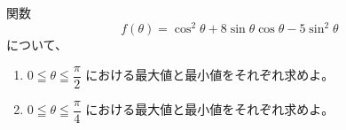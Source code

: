 \documentclass[8pt,dvipdfmx]{article}[b5paper]
\begin{document}
\begin{tcolorbox}[title=数学\textcircled{\scriptsize 3} 2-5 ABC]
関数 
\[
f(\theta)=\cos^2\theta+8\sin\theta\cos\theta-5\sin^2\theta
\]
について、
\begin{enumerate}[(1)]
\item $0\leqq\theta\leqq\dfrac{\pi}{2}$ における最大値と最小値をそれぞれ求めよ。
\item $0\leqq\theta\leqq\dfrac{\pi}{4}$ における最大値と最小値をそれぞれ求めよ。
\end{enumerate}
\end{tcolorbox}




\end{document}
